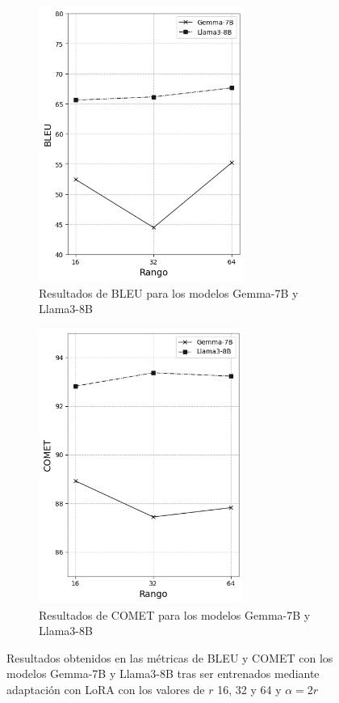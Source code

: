 \documentclass[11pt,spanish,listoffigures,listoftables]{tfgetsinf}
\begin{document}
\begin{figure}[h]

\begin{subfigure}{0.5\textwidth}
\includegraphics[width=0.9\linewidth, height=9cm]{images/gemma_llama_BLEU_} 
\caption{Resultados de BLEU para los modelos Gemma-7B y Llama3-8B}
\label{fig:subim1}
\end{subfigure}
\begin{subfigure}{0.5\textwidth}
\includegraphics[width=0.9\linewidth, height=9cm]{images/gemma_llama_COMET_}
\caption{Resultados de COMET para los modelos Gemma-7B y Llama3-8B}
\label{fig:subim2}
\end{subfigure}

\caption{Resultados obtenidos en las métricas de BLEU y COMET con los modelos Gemma-7B y Llama3-8B tras ser entrenados mediante adaptación con LoRA con los valores de $r$ 16, 32 y 64 y $\alpha = 2r$}
\label{fig:image2}
\end{figure}
\end{document}
